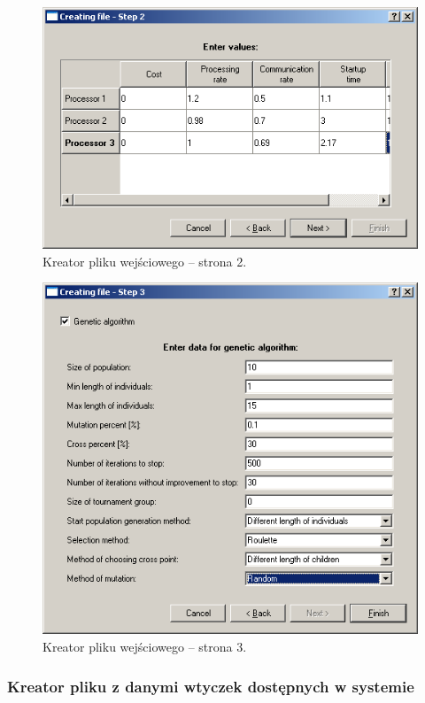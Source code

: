 \begin{figure}[htp]
\centering\includegraphics[scale=0.7]{figures/screens/generate1_2.png}
\caption{Kreator pliku wejściowego -- strona 2.}\label{rys:generate1_2}
\end{figure}

\begin{figure}[t]
\centering\includegraphics[scale=0.65]{figures/screens/generate1_3.png}
\caption{Kreator pliku wejściowego -- strona 3.}\label{rys:generate1_3}
\end{figure}

\subsubsection*{Kreator pliku z danymi wtyczek dostępnych w systemie}

